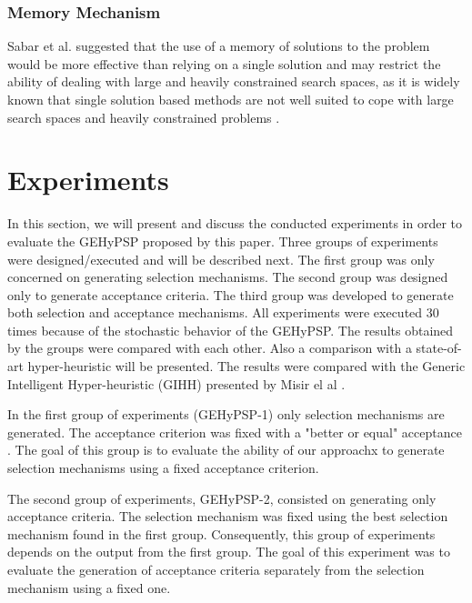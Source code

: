 \documentclass[conference]{IEEEtran}
\begin{document}
 

\subsubsection{Memory Mechanism}
Sabar et al. \cite{sabar2015automatic} suggested that the use of a memory of solutions to the problem would be more effective than relying on a single solution and may restrict the ability of dealing with large and heavily constrained search spaces, as it is widely known that single
solution based methods are not well suited to cope with
large search spaces and heavily constrained problems \cite{blum2011hybrid}.


\section{Experiments}
\label{sec:experiments}


In this section, we will present and discuss the conducted experiments in order to evaluate the GEHyPSP proposed by this paper. Three groups of experiments were designed/executed and will be described next. The first group was only concerned on generating selection mechanisms. The second group was designed only to generate acceptance criteria. The third group was developed to generate both selection and acceptance mechanisms. All experiments were executed 30 times because of the stochastic behavior of the GEHyPSP. The results obtained by the groups were compared with each other. Also a comparison with a state-of-art hyper-heuristic will be presented. The results were compared with the Generic Intelligent Hyper-heuristic (GIHH) presented by Misir el al \cite{misir2012intelligent}.

In the first group of  experiments (GEHyPSP-1) only selection mechanisms are generated. The acceptance criterion was fixed with a "better or equal" acceptance \cite{burke2009exploring}. The goal of this group is to evaluate the ability of our approachx to generate selection mechanisms using a fixed acceptance criterion.   

The second group of experiments, GEHyPSP-2, consisted on  generating only acceptance criteria. The selection mechanism was fixed using the best selection mechanism found in the first group. Consequently, this group of experiments depends on the output from the first group. The goal of this experiment was to evaluate the generation of acceptance criteria separately from the selection mechanism using a fixed one.
\end{document}
